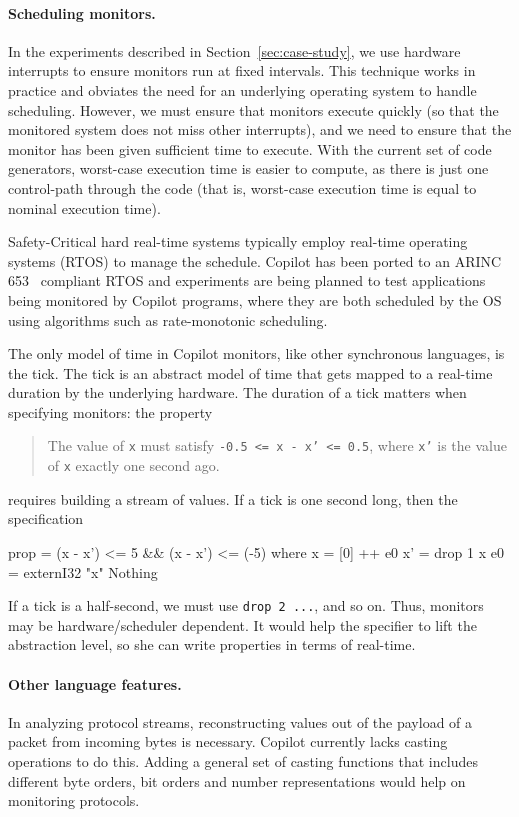 \paragraph{Scheduling monitors.}
In the experiments described in Section~\ref{sec:case-study}, we use hardware
interrupts to ensure monitors run at fixed intervals.  This technique works in
practice and obviates the need for an underlying operating system to handle
scheduling.  However, we must ensure that monitors execute quickly (so that the
monitored system does not miss other interrupts), and we need to ensure that the
monitor has been given sufficient time to execute.  With the current set of code
generators, worst-case execution time is easier to compute, as there is just one
control-path through the code (that is, worst-case execution time is equal to
nominal execution time).

    Safety-Critical hard real-time systems typically  employ real-time operating
  systems (RTOS) to manage the schedule.  Copilot has been ported to an
  ARINC 653~\cite{ARINC653-10,ARINC653-12} compliant RTOS and experiments are being planned to test
  applications being  monitored by Copilot programs, where they are both  scheduled by the OS
  using algorithms such as rate-monotonic scheduling.  

The only model of time in Copilot monitors, like other synchronous languages, is
the tick.  The tick is an abstract model of time that gets mapped to a real-time
duration by the underlying hardware.  The duration of a tick matters when
specifying monitors: the property
%
\begin{quote}
The value of {\tt x} must satisfy {\tt -0.5
  <= x - x' <= 0.5}, where {\tt x'} is the value of {\tt x} exactly one second ago.
\end{quote}
%
\noindent
requires building a stream of values.  If a tick is one second long, then the
specification
%
\begin{code}
prop = (x - x') <= 5 && (x - x') <= (-5)
  where
  x  = [0] ++ e0 
  x' = drop 1 x
  e0 = externI32 "x" Nothing
\end{code}
%
\noindent
If a tick is a half-second, we must use {\tt drop 2 ...}, and so on.  Thus,
monitors may be hardware/scheduler dependent.  It would help the specifier to
lift the abstraction level, so she can write properties in terms of real-time.

\paragraph{Other language features.}
In analyzing protocol streams, reconstructing values out of the payload of
a packet from incoming bytes is necessary. Copilot currently lacks casting
operations to do this. Adding a general set of casting functions that includes
different byte orders, bit orders and number representations would help on
monitoring protocols.

